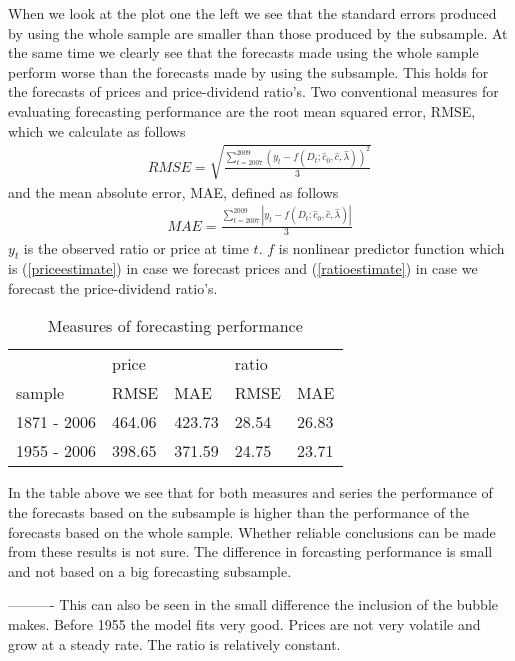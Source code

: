 \documentclass{article}
\begin{document}
When we look at the plot one the left we see that the standard errors produced by using the whole sample are smaller than those produced by the subsample. At the same time we clearly see that the forecasts made using the whole sample perform worse than the forecasts made by using the subsample. This holds for the forecasts of prices and price-dividend ratio's. Two conventional measures for evaluating forecasting performance are the root mean squared error, RMSE, which we calculate as follows
\begin{eqnarray}
RMSE = \sqrt{\frac{\sum_{t = 2007}^{2009} (y_t - f(D_t;\widehat{c}_0,\widehat{c},\widehat{\lambda}))^2}{3}} \label{MSE}
\end{eqnarray}
and the mean absolute error, MAE, defined as follows
\begin{eqnarray}
MAE = \frac{\sum_{t = 2007}^{2009} |y_t - f(D_t;\widehat{c}_0,\widehat{c},\widehat{\lambda})|}{3} \label{MAE}
\end{eqnarray}
$y_t$ is the observed ratio or price at time $t$. $f$ is nonlinear predictor function which is (\ref{priceestimate}) in case we forecast prices and (\ref{ratioestimate}) in case we forecast the price-dividend ratio's. 


\begin{table}[h!]
\centering
\begin{tabular}{l | l l| l l }
 &  price & &  ratio &  \\
sample  & RMSE & MAE & RMSE & MAE  \\ \hline
1871 - 2006  & 464.06 & 423.73 &28.54 & 26.83 \\
1955 - 2006 & 398.65 & 371.59 &24.75 & 23.71\\
\end{tabular}
\caption{Measures of forecasting performance}
\label{MSE}
\end{table}

In the table above we see that for both measures and series the performance of the forecasts based on the subsample is higher than the performance of the forecasts based on the whole sample. Whether reliable conclusions can be made from these results is not sure. The difference in forcasting performance is small and not based on a big forecasting subsample. 



----------
This can also be seen in the small difference the inclusion of the bubble makes. Before 1955 the model fits very good. Prices are not very volatile and grow at a steady rate. The ratio is relatively constant.  
\end{document}
